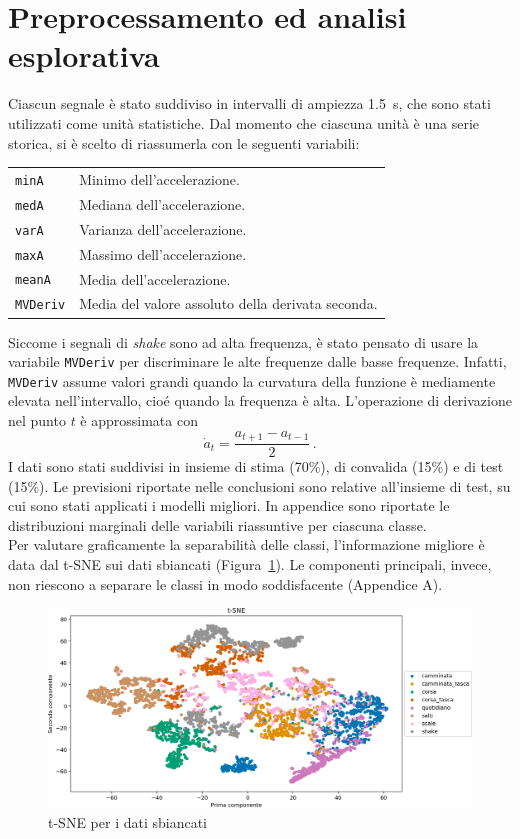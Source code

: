 \documentclass[./main.tex]{subfiles}
\begin{document}
\section{Preprocessamento ed analisi esplorativa}
Ciascun segnale è stato suddiviso in intervalli di ampiezza \SI{1.5}{s}, che sono stati utilizzati come unità statistiche. Dal momento che ciascuna unità è una serie storica, si è scelto di riassumerla con le seguenti variabili:
\begin{table}[H]
	\centering
	\begin{tabular}{ll}
		\texttt{minA}& Minimo dell'accelerazione.\\
		\texttt{medA}& Mediana dell'accelerazione.\\
		\texttt{varA}& Varianza dell'accelerazione.\\
		\texttt{maxA}& Massimo dell'accelerazione.\\
		\texttt{meanA}& Media dell'accelerazione.\\
		\texttt{MVDeriv}& Media del valore assoluto della derivata seconda.
	\end{tabular}
\end{table}
Siccome i segnali di {\em shake} sono ad alta frequenza, è stato pensato di usare la variabile \texttt{MVDeriv} per discriminare le alte frequenze dalle basse frequenze. Infatti, \texttt{MVDeriv} assume valori grandi quando la curvatura della funzione è mediamente elevata nell'intervallo, cioé quando la frequenza è alta. L'operazione di derivazione nel punto $t$ è approssimata con\cite{NumpyGradientNumPy}
\[
\dot{a}_t = \dfrac{a_{t + 1} - a_{t - 1}}{2}\,.
\]
I dati sono stati suddivisi in insieme di stima (70\%), di convalida (15\%) e di test (15\%). Le previsioni riportate nelle conclusioni sono relative all'insieme di test, su cui sono stati applicati i modelli migliori.
In appendice sono riportate le distribuzioni marginali delle variabili riassuntive per ciascuna classe.\\

Per valutare graficamente la separabilità delle classi, l'informazione migliore è data dal t-SNE sui dati sbiancati (Figura~\ref{fig:tsne}). Le componenti principali, invece, non riescono a separare le classi in modo soddisfacente (Appendice A).
\begin{figure}[H]
	\centering
	\includegraphics[width=.8\textwidth]{../../figure/t-SNE.png}
	\caption{{ t-SNE per i dati sbiancati}}
	\label{fig:tsne}
\end{figure}
\end{document}
